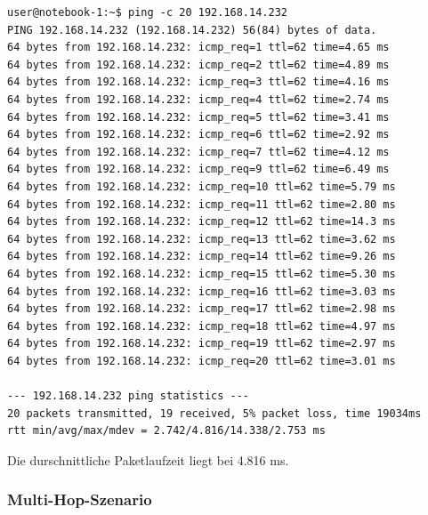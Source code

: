 \documentclass[a4paper,10pt]{article}
\begin{document}
\begin{lstlisting}
user@notebook-1:~$ ping -c 20 192.168.14.232
PING 192.168.14.232 (192.168.14.232) 56(84) bytes of data.
64 bytes from 192.168.14.232: icmp_req=1 ttl=62 time=4.65 ms
64 bytes from 192.168.14.232: icmp_req=2 ttl=62 time=4.89 ms
64 bytes from 192.168.14.232: icmp_req=3 ttl=62 time=4.16 ms
64 bytes from 192.168.14.232: icmp_req=4 ttl=62 time=2.74 ms
64 bytes from 192.168.14.232: icmp_req=5 ttl=62 time=3.41 ms
64 bytes from 192.168.14.232: icmp_req=6 ttl=62 time=2.92 ms
64 bytes from 192.168.14.232: icmp_req=7 ttl=62 time=4.12 ms
64 bytes from 192.168.14.232: icmp_req=9 ttl=62 time=6.49 ms
64 bytes from 192.168.14.232: icmp_req=10 ttl=62 time=5.79 ms
64 bytes from 192.168.14.232: icmp_req=11 ttl=62 time=2.80 ms
64 bytes from 192.168.14.232: icmp_req=12 ttl=62 time=14.3 ms
64 bytes from 192.168.14.232: icmp_req=13 ttl=62 time=3.62 ms
64 bytes from 192.168.14.232: icmp_req=14 ttl=62 time=9.26 ms
64 bytes from 192.168.14.232: icmp_req=15 ttl=62 time=5.30 ms
64 bytes from 192.168.14.232: icmp_req=16 ttl=62 time=3.03 ms
64 bytes from 192.168.14.232: icmp_req=17 ttl=62 time=2.98 ms
64 bytes from 192.168.14.232: icmp_req=18 ttl=62 time=4.97 ms
64 bytes from 192.168.14.232: icmp_req=19 ttl=62 time=2.97 ms
64 bytes from 192.168.14.232: icmp_req=20 ttl=62 time=3.01 ms

--- 192.168.14.232 ping statistics ---
20 packets transmitted, 19 received, 5% packet loss, time 19034ms
rtt min/avg/max/mdev = 2.742/4.816/14.338/2.753 ms
\end{lstlisting}

Die durschnittliche Paketlaufzeit liegt bei 4.816 ms.

\subsubsection*{Multi-Hop-Szenario}
\end{document}
